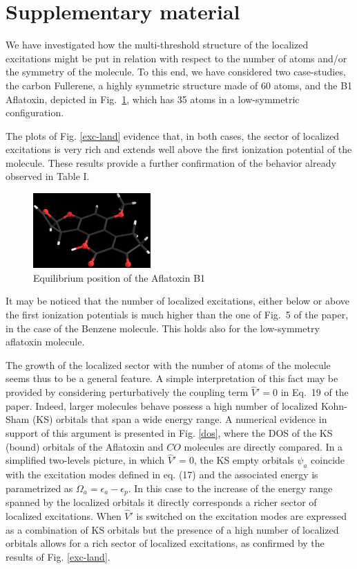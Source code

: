 \documentclass[11pt,a4paper]{article}
\newcommand{\op}[1]{\hat {#1}}
\begin{document}


\section*{Supplementary material}

We have investigated how the multi-threshold structure of the localized excitations might be put in relation with respect to
the number of atoms and/or the symmetry of the molecule. To this end, we have considered two case-studies, the carbon Fullerene, a highly symmetric structure made of 60 atoms, and the B1 Aflatoxin, depicted in Fig.~\ref{aflab1}, which has 35 atoms in a low-symmetric configuration.

The plots of Fig. \ref{exc-land} evidence that, in both cases, the sector of localized excitations is very rich and extends well above the first ionization potential of the molecule. These results provide a further confirmation of the behavior already observed in Table I.
\begin{figure}[h]
  \centering
  \includegraphics[width=0.4\textwidth]{AflaB1.eps}
    \caption{Equilibrium position of the Aflatoxin B1}
\label{aflab1}
\end{figure}

It may be noticed that the number of localized excitations, either below or above the first ionization potentials is much higher than
the one of Fig.~5 of the paper, in the case of the Benzene molecule. This holds also for the low-symmetry aflatoxin molecule.

The growth of the localized sector with the number of atoms of the molecule seems thus to be a general feature.
A simple interpretation of this fact may be provided by considering perturbatively the coupling term $\op V'=0$ in Eq.~19 of the paper.
Indeed, larger molecules behave possess a high number of localized Kohn-Sham (KS) orbitals that span a wide energy range.
A numerical evidence in support of this argument is presented in Fig. \ref{dos}, where the DOS of the KS (bound) orbitals of the Aflatoxin and $CO$ molecules are directly compared.
In a simplified two-levels picture, in which $\op V'=0$, the KS empty orbitals $\psi_a$ coincide with the excitation modes defined in eq. (17) and the associated energy is parametrized as $\Omega_a=\epsilon_a-\epsilon_p$. In this case to the increase of the energy range spanned by the localized orbitals it directly corresponds a richer sector of localized excitations.
When $\op V'$ is switched on the excitation modes are expressed as a combination of KS orbitals but the presence of a high number of localized orbitals allows for a rich sector of localized excitations, as confirmed by the results of Fig. \ref{exc-land}.
\end{document}
